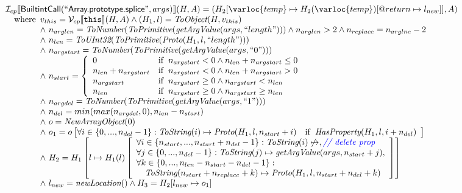 \[
\begin{array}{l}
\I _{cp}\lbr \SF{BuiltintCall}(``\SF{Array.prototype.splice}",args)\rbr(H,A)
 = (H_2[\varloc{temp}\mapsto H_2(\varloc{temp})[\varprop{return}\mapsto l_{new}]], A) \\
\quad\wherec{
  v_{this} = \V _{cp}\lbr \TT{this}\rbr (H,A) \land (H_1,l) = \hf{ToObject}(H,v_{this})\\
  \land\ n_{arglen} = \hf{ToNumber}(\hf{ToPrimitive}(\hf{getArgValue}(args, ``length")))
  \land n_{arglen} > 2 \land n_{replace} = n_{arglne} - 2\\
  \land\ n_{len} = \hf{ToUInt32}(\hf{ToPrimitive}(\hf{Proto}(H_1, l, ``length")))\\
  \land\ n_{argstart} = \hf{ToNumber}(\hf{ToPrimitive}(\hf{getArgValue}(args, ``0")))\\
  \land\ n_{start} = \left\{\begin{array}{ll}
      0 & \ifc{n_{argstart} < 0 \land n_{len} + n_{argstart} \leq 0}\\
      n_{len} + n_{argstart} & \ifc{n_{argstart} < 0 \land n_{len} + n_{argstart} > 0}\\
      n_{argstart} & \ifc{n_{argstart} \geq 0 \land n_{argstart} < n_{len}}\\
      n_{len}  & \ifc{n_{argstart} \geq 0 \land n_{argstart} \geq n_{len}}\\
    \end{array}\right.\\
  \land\ n_{argdel} = \hf{ToNumber}(\hf{ToPrimitive}(\hf{getArgValue}(args, ``1")))\\
  \land\ n_{del} = min(max(n_{argdel}, 0), n_{len} - n_{start})\\
  \land\ o = \hf{NewArrayObject}(0)\\
  \land\ o_1 = o\left[\forall i \in \{0,...,n_{del}-1\}:
    \hf{ToString}(i) \mapsto \hf{Proto}(H_1, l, n_{start}+i)
    \quad\ifc{\hf{HasProperty}(H_1, l, i+n_{del})}\right]\\
  \land\ H_2 = H_1\left[l \mapsto H_1(l)\left[
    \begin{array}{l}
      \forall i \in \{n_{start},...,n_{start}+n_{del}-1\}:\hf{ToString}(i) \not\mapsto,
        \comment{{\inblue // delete prop}}\\
      \forall j \in \{0,...,n_{del}-1\}:\hf{ToString}(j) \mapsto
        \hf{getArgValue}(args, n_{start} + j),\\
      \forall k \in \{0,...,n_{len}-n_{start}-n_{del}-1\}:\\
        \quad\hf{ToString}(n_{start} + n_{replace} + k) \mapsto \hf{Proto}(H_1, l,n_{start} + n_{del} + k)
    \end{array}
    \right]\right]\\
  \land\ l_{new} = \hf{newLocation}() \land H_3 = H_2[l_{new} \mapsto o_1]
  }\\
\\\\



\end{array}
\]

